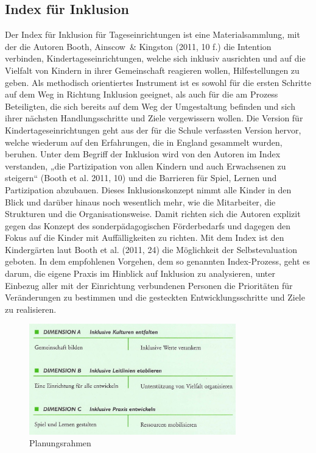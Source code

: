 \subsection{Index für Inklusion}
Der Index für Inklusion für Tageseinrichtungen ist eine Materialsammlung, mit der die Autoren Booth, Ainscow~\& Kingston (2011, 10 f.) die Intention verbinden, Kindertageseinrichtungen, welche sich inklusiv ausrichten und auf die Vielfalt von Kindern in ihrer Gemeinschaft reagieren wollen, Hilfestellungen zu geben. Als methodisch orientiertes Instrument ist es sowohl für die ersten Schritte auf dem Weg in Richtung Inklusion geeignet, als auch für die am Prozess Beteiligten, die sich bereits auf dem Weg der Umgestaltung befinden und sich ihrer nächsten Handlungsschritte und Ziele vergewissern wollen.
Die Version für Kindertageseinrichtungen geht aus der für die Schule verfassten Version hervor, welche wiederum auf den Erfahrungen, die in England gesammelt wurden, beruhen. Unter dem Begriff der Inklusion wird von den Autoren im Index verstanden, „die Partizipation von allen Kindern und auch Erwachsenen zu steigern“ (Booth et al. 2011, 10) und die Barrieren für Spiel, Lernen und Partizipation abzubauen. Dieses Inklusionskonzept nimmt alle Kinder in den Blick und darüber hinaus noch wesentlich mehr, wie die Mitarbeiter, die Strukturen und die Organisationsweise. Damit richten sich die Autoren explizit gegen das Konzept des sonderpädagogischen Förderbedarfs und dagegen den Fokus auf  die Kinder mit Auffälligkeiten zu richten.
Mit dem Index ist den Kindergärten laut Booth et al. (2011, 24) die Möglichkeit der Selbstevaluation geboten. In dem empfohlenen Vorgehen, dem so genannten Index-Prozess, geht es darum, die eigene Praxis im Hinblick auf Inklusion zu analysieren, unter Einbezug aller mit der Einrichtung verbundenen Personen die Prioritäten für Veränderungen zu bestimmen und die gesteckten Entwicklungsschritte und Ziele zu realisieren. 

\begin{figure}
  \centering
  \label{pic:planungsrahmen}
  \includegraphics[width=0.8\textwidth]{bilder/planungsrahmen}
  \caption{Planungsrahmen}
\end{figure}

